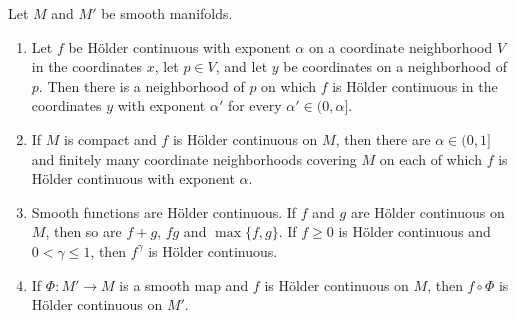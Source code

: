 \begin{lemma}\label{lem:manifold-holder-operations}
Let $M$ and $M'$ be smooth manifolds.
\begin{enumerate}
\item Let $f$ be H\"older continuous with exponent $\alpha$ on a coordinate neighborhood $V$ in the coordinates $x$, let $p\in V$, and let $y$ be coordinates on a neighborhood of $p$. Then there is a neighborhood of $p$ on which $f$ is H\"older continuous in the coordinates $y$ with exponent $\alpha'$ for every $\alpha'\in(0,\alpha]$.
\item If $M$ is compact and $f$ is H\"older continuous on $M$, then there are $\alpha\in(0,1]$ and finitely many coordinate neighborhoods covering $M$ on each of which $f$ is H\"older continuous with exponent $\alpha$.
\item Smooth functions are H\"older continuous. If $f$ and $g$ are H\"older continuous on $M$, then so are $f+g$, $fg$ and $\max\{f,g\}$. If $f\geq0$ is H\"older continuous and $0<\gamma\leq1$, then $f^\gamma$ is H\"older continuous.
\item If $\Phi\colon M'\to M$ is a smooth map and $f$ is H\"older continuous on $M$, then $f\circ\Phi$ is H\"older continuous on $M'$.
\end{enumerate}
\end{lemma}
